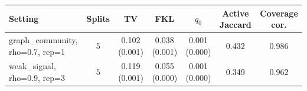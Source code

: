 \begin{tabular}{lcccccc}
\toprule
Setting & Splits & TV & FKL & $q_0$ & Active Jaccard & Coverage cor. \\
\midrule
graph\_community, rho=0.7, rep=1 & 5 & 0.102 (0.001) & 0.038 (0.001) & 0.001 (0.000) & 0.432 & 0.986 \\
weak\_signal, rho=0.9, rep=3 & 5 & 0.119 (0.001) & 0.055 (0.000) & 0.001 (0.000) & 0.349 & 0.962 \\
\bottomrule
\end{tabular}
